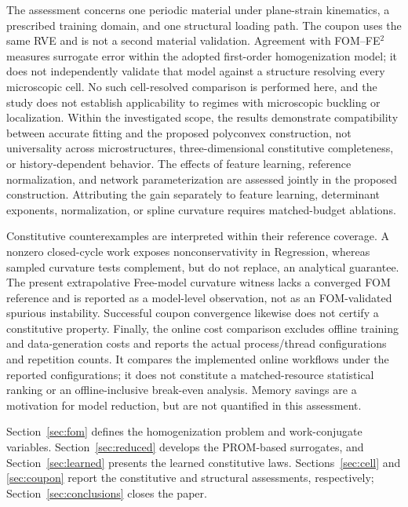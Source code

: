 The assessment concerns one periodic material under plane-strain kinematics, a prescribed training domain, and one structural loading path. The coupon uses the same RVE and is not a second material validation. Agreement with FOM--FE$^2$ measures surrogate error within the adopted first-order homogenization model; it does not independently validate that model against a structure resolving every microscopic cell. No such cell-resolved comparison is performed here, and the study does not establish applicability to regimes with microscopic buckling or localization. Within the investigated scope, the results demonstrate compatibility between accurate fitting and the proposed polyconvex construction, not universality across microstructures, three-dimensional constitutive completeness, or history-dependent behavior. The effects of feature learning, reference normalization, and network parameterization are assessed jointly in the proposed construction. Attributing the gain separately to feature learning, determinant exponents, normalization, or spline curvature requires matched-budget ablations.

Constitutive counterexamples are interpreted within their reference coverage. A nonzero closed-cycle work exposes nonconservativity in Regression, whereas sampled curvature tests complement, but do not replace, an analytical guarantee. The present extrapolative Free-model curvature witness lacks a converged FOM reference and is reported as a model-level observation, not as an FOM-validated spurious instability. Successful coupon convergence likewise does not certify a constitutive property. Finally, the online cost comparison excludes offline training and data-generation costs and reports the actual process/thread configurations and repetition counts. It compares the implemented online workflows under the reported configurations; it does not constitute a matched-resource statistical ranking or an offline-inclusive break-even analysis. Memory savings are a motivation for model reduction, but are not quantified in this assessment.

Section~\ref{sec:fom} defines the homogenization problem and work-conjugate variables. Section~\ref{sec:reduced} develops the PROM-based surrogates, and Section~\ref{sec:learned} presents the learned constitutive laws. Sections~\ref{sec:cell} and \ref{sec:coupon} report the constitutive and structural assessments, respectively; Section~\ref{sec:conclusions} closes the paper.

\FloatBarrier
